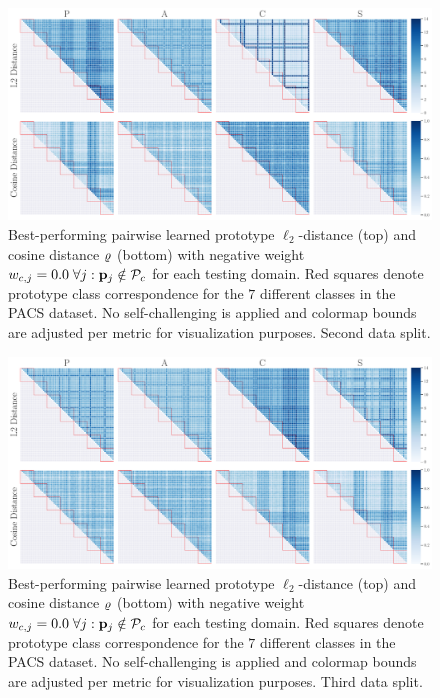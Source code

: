 
\begin{figure}[ht]
    \centering
    \includegraphics[width=\textwidth]{Figures/Chapter4/2021-01-21-ProDropIncorrectWeight0.0SAVEResNet18oracle_validation_trial1.pdf}
    \caption[Second data split pairwise prototype distances with $w_{c,j} = 0.0$] {Best-performing pairwise learned prototype $\ell_2$-distance (top) and cosine distance $\varrho$ (bottom) with negative weight $w_{c,j} = 0.0\; \forall j: \mathbf{p}_{j} \notin \mathcal{P}_c$ for each testing domain. Red squares denote prototype class correspondence for the $7$ different classes in the PACS dataset. No self-challenging is applied and colormap bounds are adjusted per metric for visualization purposes. Second data split.}
    \label{fig:pw_distance_0.0_trial1}
\end{figure}

\begin{figure}[ht]
    \centering
    \includegraphics[width=\textwidth]{Figures/Chapter4/2021-01-21-ProDropIncorrectWeight0.0SAVEResNet18oracle_validation_trial2.pdf}
    \caption[Third data split pairwise prototype distances with $w_{c,j} = 0.0$] {Best-performing pairwise learned prototype $\ell_2$-distance (top) and cosine distance $\varrho$ (bottom) with negative weight $w_{c,j} = 0.0\; \forall j: \mathbf{p}_{j} \notin \mathcal{P}_c$ for each testing domain. Red squares denote prototype class correspondence for the $7$ different classes in the PACS dataset. No self-challenging is applied and colormap bounds are adjusted per metric for visualization purposes. Third data split.}
    \label{fig:pw_distance_0.0_trial2}
\end{figure}

